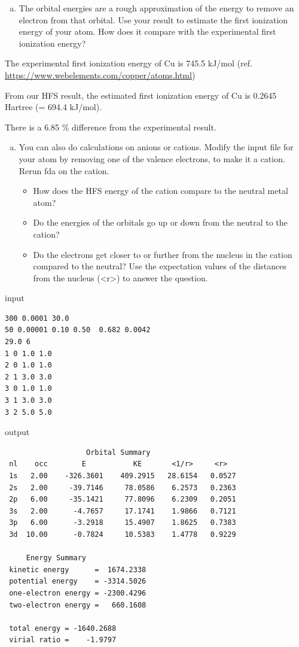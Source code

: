 \documentclass[11pt]{article}
\begin{document}
\begin{enumerate}[(d)]
\item The orbital energies are a rough approximation of the energy to remove an electron from that orbital. Use your result to estimate the first ionization energy of your atom. How does it compare with the experimental first ionization energy?
\end{enumerate}

The experimental first ionization energy of Cu is 745.5 kJ/mol (ref. \url{https://www.webelements.com/copper/atoms.html})

From our HFS result, the estimated first ionization energy of Cu is 0.2645 Hartree (= 694.4 kJ/mol). 

There is a 6.85 \% difference from the experimental result.

\begin{enumerate}[(e)]
\item You can also do calculations on anions or cations. Modify the input file for your atom by removing one of the valence electrons, to make it a cation. Rerun fda on the cation. 

\begin{itemize}
\item How does the HFS energy of the cation compare to the neutral metal atom?
\item Do the energies of the orbitals go up or down from the neutral to the cation?
\item Do the electrons get closer to or further from the nucleus in the cation compared to the neutral? Use the expectation values of the distances from the nucleus (<r>) to answer the question.
\end{itemize}
\end{enumerate}

input
\begin{verbatim}
300 0.0001 30.0
50 0.00001 0.10 0.50  0.682 0.0042
29.0 6
1 0 1.0 1.0
2 0 1.0 1.0
2 1 3.0 3.0
3 0 1.0 1.0
3 1 3.0 3.0
3 2 5.0 5.0
\end{verbatim}

output
\begin{verbatim}
                   Orbital Summary
 nl    occ        E           KE       <1/r>     <r>
 1s   2.00    -326.3601    409.2915   28.6154   0.0527
 2s   2.00     -39.7146     78.0586    6.2573   0.2363
 2p   6.00     -35.1421     77.8096    6.2309   0.2051
 3s   2.00      -4.7657     17.1741    1.9866   0.7121
 3p   6.00      -3.2918     15.4907    1.8625   0.7383
 3d  10.00      -0.7824     10.5383    1.4778   0.9229

     Energy Summary
 kinetic energy      =  1674.2338
 potential energy    = -3314.5026
 one-electron energy = -2300.4296
 two-electron energy =   660.1608

 total energy = -1640.2688
 virial ratio =    -1.9797
\end{verbatim}
\end{document}
